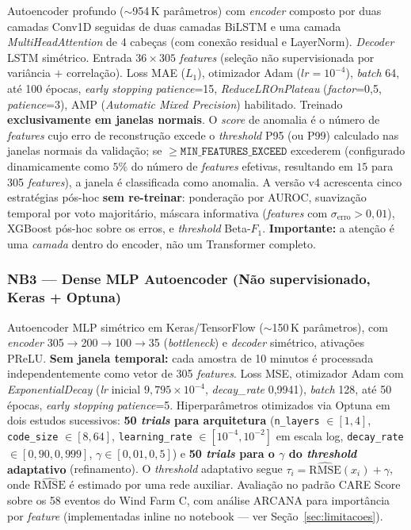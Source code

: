 \documentclass[12pt]{article}
\begin{document}
Autoencoder profundo ($\sim$954\,K parâmetros) com \textit{encoder} composto por duas camadas Conv1D seguidas de duas camadas BiLSTM e uma camada \textit{MultiHeadAttention} de 4 cabeças (com conexão residual e LayerNorm). \textit{Decoder} LSTM simétrico. Entrada $36 \times 305$ \textit{features} (seleção não supervisionada por variância $+$ correlação). Loss MAE ($L_1$), otimizador Adam ($lr=10^{-4}$), \textit{batch} 64, até 100 épocas, \textit{early stopping} \textit{patience}=15, \textit{ReduceLROnPlateau} (\textit{factor}=0,5, \textit{patience}=3), AMP (\textit{Automatic Mixed Precision}) habilitado. Treinado \textbf{exclusivamente em janelas normais}. O \textit{score} de anomalia é o número de \textit{features} cujo erro de reconstrução excede o \textit{threshold} P95 (ou P99) calculado nas janelas normais da validação; se $\geq \mathtt{MIN\_FEATURES\_EXCEED}$ excederem (configurado dinamicamente como $5\%$ do número de \textit{features} efetivas, resultando em $15$ para 305 \textit{features}), a janela é classificada como anomalia. A versão v4 acrescenta cinco estratégias pós-hoc \textbf{sem re-treinar}: ponderação por AUROC, suavização temporal por voto majoritário, máscara informativa (\textit{features} com $\sigma_{\mathrm{erro}} > 0,01$), XGBoost pós-hoc sobre os erros, e \textit{threshold} Beta-$F_1$. \textbf{Importante:} a atenção é uma \textit{camada} dentro do encoder, não um Transformer completo.

\subsubsection{NB3 --- Dense MLP Autoencoder (Não supervisionado, Keras + Optuna)}

Autoencoder MLP simétrico em Keras/TensorFlow ($\sim$150\,K parâmetros), com \textit{encoder} 305$\to$200$\to$100$\to$35 (\textit{bottleneck}) e \textit{decoder} simétrico, ativações PReLU. \textbf{Sem janela temporal:} cada amostra de 10 minutos é processada independentemente como vetor de 305 \textit{features}. Loss MSE, otimizador Adam com \textit{ExponentialDecay} (\textit{lr} inicial $9{,}795 \times 10^{-4}$, \textit{decay\_rate} 0,9941), \textit{batch} 128, até 50 épocas, \textit{early stopping} \textit{patience}=5. Hiperparâmetros otimizados via Optuna em dois estudos sucessivos: \textbf{50 \textit{trials} para arquitetura} (\texttt{n\_layers} $\in [1,4]$, \texttt{code\_size} $\in [8,64]$, \texttt{learning\_rate} $\in [10^{-4}, 10^{-2}]$ em escala log, \texttt{decay\_rate} $\in [0{,}90, 0{,}999]$, $\gamma \in [0{,}01, 0{,}5]$) e \textbf{50 \textit{trials} para o $\gamma$ do \textit{threshold} adaptativo} (refinamento). O \textit{threshold} adaptativo segue $\tau_i = \widehat{\mathrm{RMSE}}(x_i) + \gamma$, onde $\widehat{\mathrm{RMSE}}$ é estimado por uma rede auxiliar. Avaliação no padrão CARE Score sobre os 58 eventos do Wind Farm C, com análise ARCANA para importância por \textit{feature} (implementadas inline no notebook --- ver Seção~\ref{sec:limitacoes}).
\end{document}
